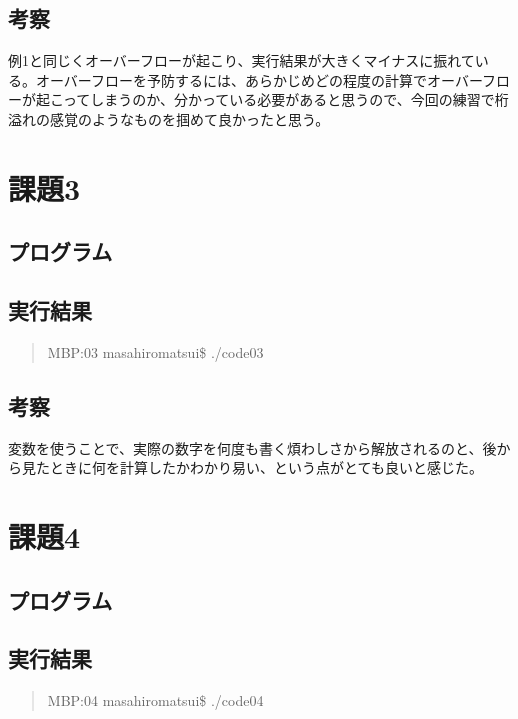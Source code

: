 \documentclass[11pt,a4paper]{jsarticle}
\begin{document}
\subsection{考察}
例1と同じくオーバーフローが起こり、実行結果が大きくマイナスに振れている。オーバーフローを予防するには、あらかじめどの程度の計算でオーバーフローが起こってしまうのか、分かっている必要があると思うので、今回の練習で桁溢れの感覚のようなものを掴めて良かったと思う。
%
%
\section{課題3}

\subsection{プログラム}
\label{sec:prog-list1}

%
\subsection{実行結果}
\begin{quote}           %
MBP:03 masahiromatsui\$ ./code03 \\

\end{quote}
%
\subsection{考察}
変数を使うことで、実際の数字を何度も書く煩わしさから解放されるのと、後から見たときに何を計算したかわかり易い、という点がとても良いと感じた。
%
\section{課題4}

\subsection{プログラム}
\label{sec:prog-list1}

%
\subsection{実行結果}
\begin{quote}           %
MBP:04 masahiromatsui\$ ./code04 \\

\end{quote}
%
\end{document}
